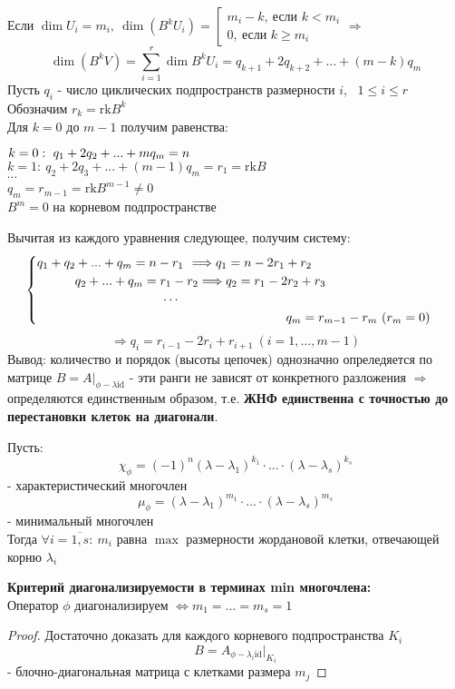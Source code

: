     Если $\dim U_i = m_i, \ \dim (B^kU_i) = \left[\begin{matrix}
        m_i - k, \ \text{если } k<m_i\\
        0, \ \text{если } k\geq m_i
    \end{matrix} \right. \Longrightarrow$
    $$\dim (B^kV) = \sum \limits_{i=1}^r \dim B^kU_i = q_{k+1}+2q_{k+2} + ... + (m-k)q_m$$ 
    Пусть $q_i$ - число циклических подпространств размерности $i$, \ $1\leq i \leq r$\\
    Обозначим $r_k = \text{rk}B^k$\\
    Для $k = 0$ до $m-1$ получим равенства: 
    \begin{center}
        $k=0: \ q_1 + 2q_2 + ... + mq_m = n\tab[2.9cm]$\\
        $k=1: \ q_2 + 2q_3 + ... + (m-1)q_m = r_1 = \text{rk}B$\\
        $\cdots$\\
        $q_m = r_{m-1} = \text{rk}B^{m-1} \neq 0$ \\
        $B^m = 0$ на корневом подпространстве     
    \end{center}
    Вычитая из каждого уравнения следующее, получим систему:
    $$\begin{cases}
        q_1 + q_2 + ... + q_m = n - r_1 \tab[0.13cm] \Longrightarrow q_1 = n - 2r_1 + r_2 \\
        \tab[1.05cm] q_2 + ... + q_m = r_1 - r_2 \Longrightarrow q_2 = r_1 - 2r_2 + r_3\\
        \tab[3.5cm]\cdots\\
        \tab[6.9cm]q_m = r_{m-1} - r_m \ (r_m = 0)
    \end{cases}$$
    $$\Longrightarrow q_i = r_{i-1} - 2r_i + r_{i+1} \ (i = 1,...,m-1)$$
    Вывод: количество и порядок (высоты цепочек) однозначно опреледяется по матрице $B=A|_{\phi-\lambda \text{id}}$ - эти ранги не зависят от конкретного разложения $\Longrightarrow$ определяются единственным образом, т.е. \textbf{ЖНФ единственна с точностью до перестановки клеток на диагонали}.
    \begin{consequense}
        Пусть: 
        $$\chi_\phi = (-1)^n(\lambda-\lambda_1)^{k_1}\cdot ... \cdot (\lambda-\lambda_s)^{k_s}$$
        - характеристический многочлен
        $$\mu_\phi = (\lambda-\lambda_1)^{m_1}\cdot ... \cdot (\lambda-\lambda_s)^{m_s}$$
        - минимальный многочлен\\
        Тогда $\forall i = \overline{1,s}: \ m_i$ равна $\max$ размерности жордановой клетки, отвечающей корню $\lambda_i$   
    \end{consequense}
    \begin{consequense}\textbf{ Критерий диагонализируемости в терминах min многочлена:} \\
        Оператор $\phi$ диагонализируем $\Longleftrightarrow m_1 = ... =m_s=1$  
    \end{consequense}
    \begin{proof}
        Достаточно доказать для каждого корневого подпространства $K_i$
        $$B = A_{\phi-\lambda_i \text{id}}|_{K_i}$$
        - блочно-диагональная матрица с клетками размера $m_j$   
    \end{proof} 

